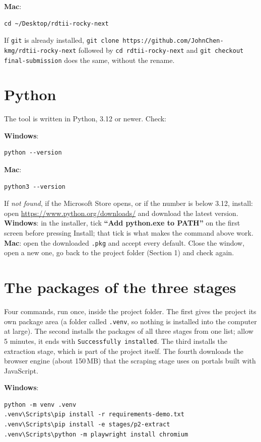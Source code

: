 \documentclass[11pt,a4paper]{article}
\newcommand{\win}{\textbf{Windows}}
\newcommand{\mac}{\textbf{Mac}}
\begin{document}
\mac:
\begin{lstlisting}
cd ~/Desktop/rdtii-rocky-next
\end{lstlisting}

If \texttt{git} is already installed, \texttt{git clone https://github.com/JohnChen-kmg/rdtii-rocky-next}
followed by \texttt{cd rdtii-rocky-next} and \texttt{git checkout final-submission} does
the same, without the rename.

\section{Python}

The tool is written in Python, 3.12 or newer. Check:

\win:
\begin{lstlisting}
python --version
\end{lstlisting}

\mac:
\begin{lstlisting}
python3 --version
\end{lstlisting}

If \emph{not found}, if the Microsoft Store opens, or if the number is below 3.12, install:
open \url{https://www.python.org/downloads/} and download the latest version.
\win: in the installer, tick \textbf{``Add python.exe to PATH''} on the first screen before
pressing Install; that tick is what makes the command above work.
\mac: open the downloaded \texttt{.pkg} and accept every default.
Close the window, open a new one, go back to the project folder (Section 1) and check again.

\section{The packages of the three stages}

Four commands, run once, inside the project folder. The first gives the project its own
package area (a folder called \texttt{.venv}, so nothing is installed into the computer at
large). The second installs the packages of all three stages from one list; allow 5
minutes, it ends with \texttt{Successfully installed}. The third installs the extraction
stage, which is part of the project itself. The fourth downloads the browser engine (about
150\,MB) that the scraping stage uses on portals built with JavaScript.

\win:
\begin{lstlisting}
python -m venv .venv
.venv\Scripts\pip install -r requirements-demo.txt
.venv\Scripts\pip install -e stages/p2-extract
.venv\Scripts\python -m playwright install chromium
\end{lstlisting}
\end{document}
